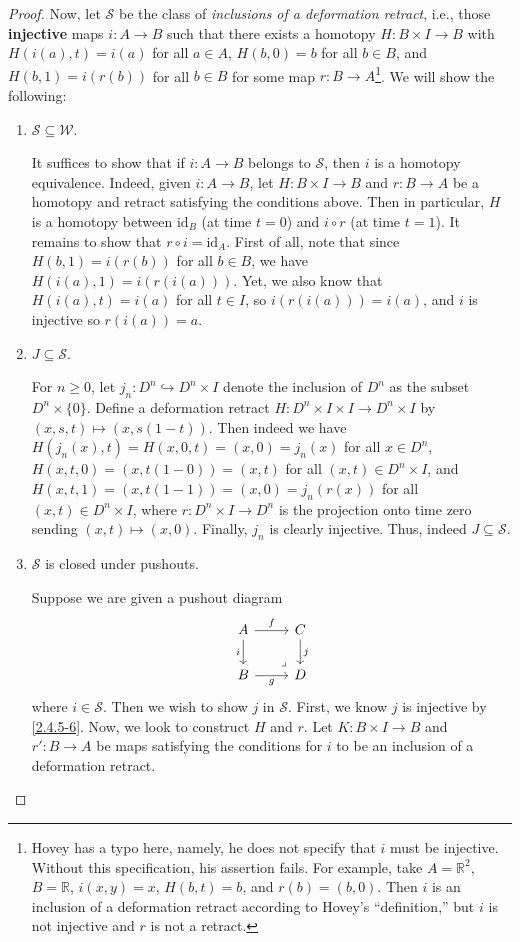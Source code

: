 \documentclass{amsart}
\theoremstyle{plain}
\theoremstyle{definition}
\newcommand{\sseq}{\subseteq}
\newcommand{\0}{\mathbf{0}}
\newcommand{\bR}{\mathbb{R}}
\newcommand{\id}{\mathrm{id}}
\newcommand{\into}{\hookrightarrow}
\newcommand{\cS}{\mathcal S}
\newcommand{\cW}{\mathcal W}
\renewcommand{\(}{\left(}
\renewcommand{\)}{\right)}
\begin{document}
\begin{proof}
  Now, let $\cS$ be the class of \textit{inclusions of a deformation retract}, i.e., those \textbf{injective} maps $i:A\to B$ such that there exists a homotopy $H:B\times I\to B$ with $H(i(a),t)=i(a)$ for all $a\in A$, $H(b,0)=b$ for all $b\in B$, and $H(b,1)=i(r(b))$ for all $b\in B$ for some map $r:B\to A$\footnote{Hovey has a typo here, namely, he does not specify that $i$ must be injective. Without this specification, his assertion fails. For example, take $A=\bR^2$, $B=\bR$, $i(x,y)=x$, $H(b,t)=b$, and $r(b)=(b,0)$. Then $i$ is an inclusion of a deformation retract according to Hovey's ``definition,'' but $i$ is not injective and $r$ is not a retract.}. We will show the following:
  \begin{enumerate}[listparindent=\parindent,parsep=0pt]
    \item $\cS\sseq\cW$.
    
    It suffices to show that if $i:A\to B$ belongs to $\cS$, then $i$ is a homotopy equivalence. Indeed, given $i:A\to B$, let $H:B\times I\to B$ and $r:B\to A$ be a homotopy and retract satisfying the conditions above. Then in particular, $H$ is a homotopy between $\id_B$ (at time $t=0$) and $i\circ r$ (at time $t=1$). It remains to show that $r\circ i=\id_A$. First of all, note that since $H(b,1)=i(r(b))$ for all $b\in B$, we have $H(i(a),1)=i(r(i(a)))$. Yet, we also know that $H(i(a),t)=i(a)$ for all $t\in I$, so $i(r(i(a)))=i(a)$, and $i$ is injective so $r(i(a))=a$.

    \item $J\sseq\cS$.
    
    For $n\geq0$, let $j_n:D^n\into D^n\times I$ denote the inclusion of $D^n$ as the subset $D^n\times\{0\}$. Define a deformation retract $H:D^n\times I\times I\to D^n\times I$ by $(x,s,t)\mapsto(x,s(1-t))$. Then indeed we have $H(j_n(x),t)=H(x,0,t)=(x,0)=j_n(x)$ for all $x\in D^n$, $H(x,t,0)=(x,t(1-0))=(x,t)$ for all $(x,t)\in D^n\times I$, and $H(x,t,1)=(x,t(1-1))=(x,0)=j_n(r(x))$ for all $(x,t)\in D^n\times I$, where $r:D^n\times I\to D^n$ is the projection onto time zero sending $(x,t)\mapsto(x,0)$. Finally, $j_n$ is clearly injective. Thus, indeed $J\sseq\cS$.

    \item $\cS$ is closed under pushouts.
    
    Suppose we are given a pushout diagram
    \[\begin{tikzcd}
      A & C \\
      B & D
      \arrow["i"', from=1-1, to=2-1]
      \arrow["g"', from=2-1, to=2-2]
      \arrow["f", from=1-1, to=1-2]
      \arrow["j", from=1-2, to=2-2]
      \arrow["\ulcorner"{anchor=center, pos=0.125, rotate=180}, draw=none, from=2-2, to=1-1]
    \end{tikzcd}\]
    where $i\in\cS$. Then we wish to show $j$ in $\cS$. First, we know $j$ is injective by \autoref{2.4.5-6}. Now, we look to construct $H$ and $r$. Let $K:B\times I\to B$ and $r':B\to A$ be maps satisfying the conditions for $i$ to be an inclusion of a deformation retract.


\end{enumerate}
\end{proof}
\end{document}
